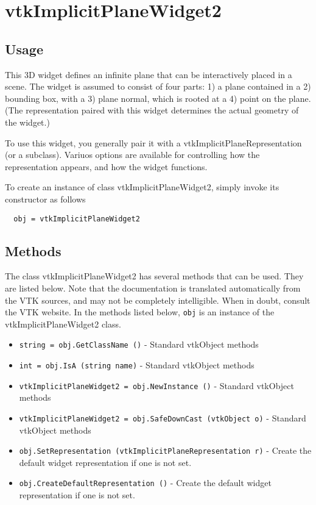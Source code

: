 \section{vtkImplicitPlaneWidget2}

\subsection{Usage}

 This 3D widget defines an infinite plane that can be interactively placed
 in a scene. The widget is assumed to consist of four parts: 1) a plane
 contained in a 2) bounding box, with a 3) plane normal, which is rooted
 at a 4) point on the plane. (The representation paired with this widget
 determines the actual geometry of the widget.)

 To use this widget, you generally pair it with a vtkImplicitPlaneRepresentation
 (or a subclass). Variuos options are available for controlling how the 
 representation appears, and how the widget functions.

To create an instance of class vtkImplicitPlaneWidget2, simply
invoke its constructor as follows
\begin{verbatim}
  obj = vtkImplicitPlaneWidget2
\end{verbatim}
\subsection{Methods}

The class vtkImplicitPlaneWidget2 has several methods that can be used.
  They are listed below.
Note that the documentation is translated automatically from the VTK sources,
and may not be completely intelligible.  When in doubt, consult the VTK website.
In the methods listed below, \verb|obj| is an instance of the vtkImplicitPlaneWidget2 class.
\begin{itemize}
\item  \verb|string = obj.GetClassName ()| -  Standard vtkObject methods

\item  \verb|int = obj.IsA (string name)| -  Standard vtkObject methods

\item  \verb|vtkImplicitPlaneWidget2 = obj.NewInstance ()| -  Standard vtkObject methods

\item  \verb|vtkImplicitPlaneWidget2 = obj.SafeDownCast (vtkObject o)| -  Standard vtkObject methods

\item  \verb|obj.SetRepresentation (vtkImplicitPlaneRepresentation r)| -  Create the default widget representation if one is not set. 

\item  \verb|obj.CreateDefaultRepresentation ()| -  Create the default widget representation if one is not set. 

\end{itemize}
